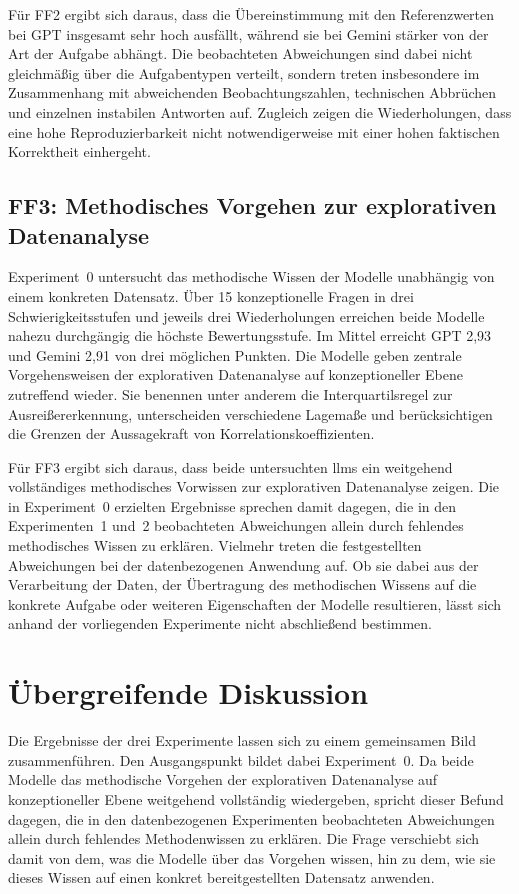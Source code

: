 Für FF2 ergibt sich daraus, dass die Übereinstimmung mit den Referenzwerten bei GPT insgesamt sehr hoch ausfällt, während sie bei Gemini stärker von der Art der Aufgabe abhängt. Die beobachteten Abweichungen sind dabei nicht gleichmäßig über die Aufgabentypen verteilt, sondern treten insbesondere im Zusammenhang mit abweichenden Beobachtungszahlen, technischen Abbrüchen und einzelnen instabilen Antworten auf. Zugleich zeigen die Wiederholungen, dass eine hohe Reproduzierbarkeit nicht notwendigerweise mit einer hohen faktischen Korrektheit einhergeht.

\subsection{FF3: Methodisches Vorgehen zur explorativen Datenanalyse}

Experiment~0 untersucht das methodische Wissen der Modelle unabhängig von einem konkreten Datensatz. Über 15 konzeptionelle Fragen in drei Schwierigkeitsstufen und jeweils drei Wiederholungen erreichen beide Modelle nahezu durchgängig die höchste Bewertungsstufe. Im Mittel erreicht GPT 2,93 und Gemini 2,91 von drei möglichen Punkten. Die Modelle geben zentrale Vorgehensweisen der explorativen Datenanalyse auf konzeptioneller Ebene zutreffend wieder. Sie benennen unter anderem die Interquartilsregel zur Ausreißererkennung, unterscheiden verschiedene Lagemaße und berücksichtigen die Grenzen der Aussagekraft von Korrelationskoeffizienten.

Für FF3 ergibt sich daraus, dass beide untersuchten \glspl{llm} ein weitgehend vollständiges methodisches Vorwissen zur explorativen Datenanalyse zeigen. Die in Experiment~0 erzielten Ergebnisse sprechen damit dagegen, die in den Experimenten~1 und~2 beobachteten Abweichungen allein durch fehlendes methodisches Wissen zu erklären. Vielmehr treten die festgestellten Abweichungen bei der datenbezogenen Anwendung auf. Ob sie dabei aus der Verarbeitung der Daten, der Übertragung des methodischen Wissens auf die konkrete Aufgabe oder weiteren Eigenschaften der Modelle resultieren, lässt sich anhand der vorliegenden Experimente nicht abschließend bestimmen.

\section{Übergreifende Diskussion}

Die Ergebnisse der drei Experimente lassen sich zu einem gemeinsamen Bild zusammenführen. Den Ausgangspunkt bildet dabei Experiment~0. Da beide Modelle das methodische Vorgehen der explorativen Datenanalyse auf konzeptioneller Ebene weitgehend vollständig wiedergeben, spricht dieser Befund dagegen, die in den datenbezogenen Experimenten beobachteten Abweichungen allein durch fehlendes Methodenwissen zu erklären. Die Frage verschiebt sich damit von dem, was die Modelle über das Vorgehen wissen, hin zu dem, wie sie dieses Wissen auf einen konkret bereitgestellten Datensatz anwenden.


